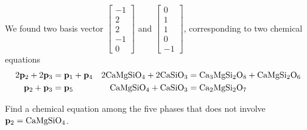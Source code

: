 \begin{applicationActivities}
\begin{activity}{10}
We found two basis vector $\begin{bmatrix} -1 \\ 2 \\ 2 \\ -1 \\ 0 \end{bmatrix}$ and $\begin{bmatrix} 0 \\ 1 \\ 1 \\ 0 \\ -1 \end{bmatrix}$, corresponding to two chemical equations
\begin{align*}
2\vec{p}_2 + 2 \vec{p}_3 &= \vec{p}_1 + \vec{p}_4 & 2{\rm CaMgSiO_4}+2{\rm CaSiO_3}&={\rm Ca_3MgSi_2O_8}+{\rm CaMgSi_2O_6}\\
\vec{p}_2 +\vec{p}_3 &= \vec{p}_5 &  {\rm CaMgSiO_4} + {\rm CaSiO_3} &= {\rm Ca_2MgSi_2O_7}
\end{align*}

Find a chemical equation among the five phases that does not involve $\vec{p}_2 = {\rm CaMgSiO_4}$.
\end{activity}




\end{applicationActivities}
